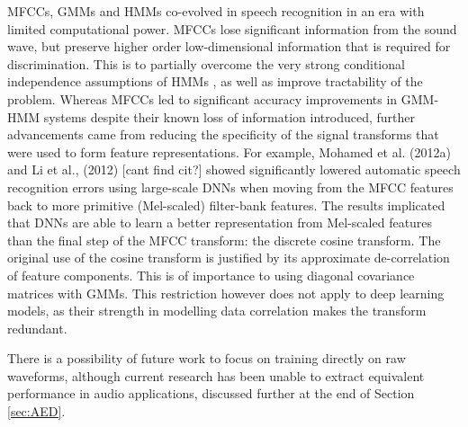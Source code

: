 \documentclass[12pt]{llncs}
\begin{document}
 MFCCs, GMMs and HMMs co-evolved in speech recognition in an era with limited computational power. MFCCs lose significant information from the sound wave, but preserve higher order low-dimensional information that is required for discrimination. This is to partially overcome the very strong conditional independence assumptions of HMMs \cite{mohamed2012acoustic}, as well as improve tractability of the problem.
Whereas MFCCs led to significant accuracy improvements in GMM-HMM systems despite their known loss of information introduced, further advancements came from reducing the specificity of the signal transforms that were used to form feature representations.
For example, Mohamed et al. (2012a) \cite{mohamed2012acoustic} and Li et al., (2012) [cant find cit?] showed significantly lowered automatic speech recognition errors using large-scale DNNs when moving from the MFCC features back to more primitive (Mel-scaled) filter-bank features. The results implicated that DNNs are able to learn a better representation from Mel-scaled features than the final step of the MFCC transform: the discrete cosine transform. The original use of the cosine transform is justified by its approximate de-correlation of feature components. This is of importance to using diagonal covariance matrices with GMMs. This restriction however does not apply to deep learning models, as their strength in modelling data correlation makes the transform redundant. 

There is a possibility of future work to focus on training directly on raw waveforms, although current research has been unable to extract equivalent performance in audio applications, discussed further at the end of Section \ref{sec:AED}.


\end{document}
